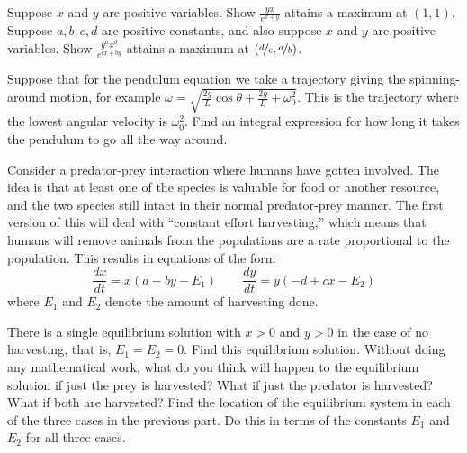 \begin{exercise}
\leavevmode
\begin{tasks}
\task Suppose $x$ and $y$ are
positive variables.  Show $\frac{y x}{e^{x+y}}$
attains a maximum at $(1,1)$.
\task Suppose $a,b,c,d$ are positive constants, and also suppose $x$ and $y$ are
positive variables.  Show $\frac{y^a x^d}{e^{cx+by}}$
attains a maximum at $(\nicefrac{d}{c},\nicefrac{a}{b})$.
\end{tasks}
\end{exercise}

\begin{exercise}
Suppose that for the pendulum equation we take a trajectory giving the
spinning-around motion, for example $\omega = \sqrt{\frac{2g}{L} \cos \theta
+ \frac{2g}{L} + \omega_0^2}$.  This is the trajectory where the lowest
angular velocity is $\omega_0^2$.  Find an integral expression for how long it takes
the pendulum to go all the way around.
\end{exercise}


\begin{exercise}
Consider a predator-prey interaction where humans have gotten involved. The idea is that at least one of the species is valuable for food or another resource, and the two species still intact in their normal predator-prey manner. The first version of this will deal with ``constant effort harvesting,'' which means that humans will remove animals from the populations are a rate proportional to the population. This results in equations of the form
\[ \frac{dx}{dt} = x(a - by - E_1) \qquad \frac{dy}{dt} = y(-d + cx - E_2) \] where $E_1$ and $E_2$ denote the amount of harvesting done.
\begin{tasks}
\task There is a single equilibrium solution with $x > 0$ and $y>0$ in the case of no harvesting, that is, $E_1 = E_2 = 0$. Find this equilibrium solution.
\task Without doing any mathematical work, what do you think will happen to the equilibrium solution if just the prey is harvested? What if just the predator is harvested? What if both are harvested?
\task Find the location of the equilibrium system in each of the three cases in the previous part. Do this in terms of the constants $E_1$ and $E_2$ for all three cases. 
\end{tasks}
\end{exercise}


